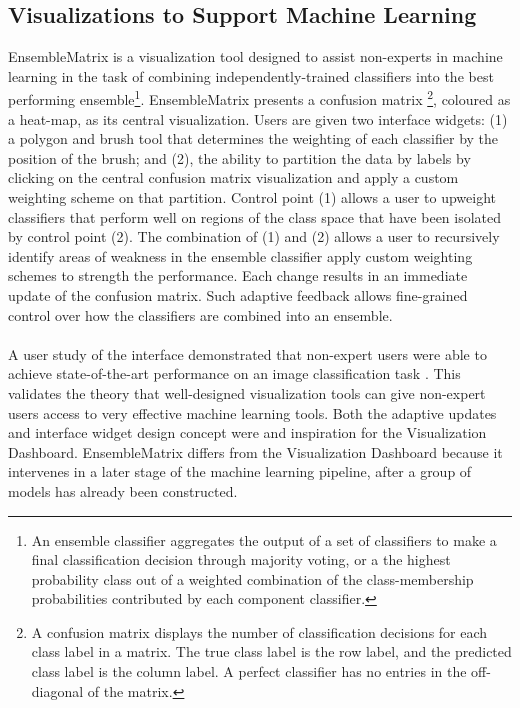 \documentclass{sigchi}
\begin{document}
\subsection{Visualizations to Support Machine Learning}
%
EnsembleMatrix \cite{talbot2009ensemblematrix} is a visualization tool designed to assist non-experts in machine learning in the task of combining independently-trained classifiers into the best performing ensemble\footnote{An ensemble classifier aggregates the output of a set of classifiers to make a final classification decision through majority voting, or a the highest probability class out of a weighted combination of the class-membership probabilities contributed by each component classifier.}. %
%
EnsembleMatrix presents a confusion matrix \footnote{A confusion matrix displays the number of classification decisions for each class label in a matrix. The true class label is the row label, and the predicted class label is the column label. A perfect classifier has no entries in the off-diagonal of the matrix.}, coloured as a heat-map, as its central visualization. %
%
Users are given two interface widgets: (1) a polygon and brush tool that determines the weighting of each classifier by the position of the brush; and (2), the ability to partition the data by labels by clicking on the central confusion matrix visualization and apply a custom weighting scheme on that partition. %
%
Control point (1) allows a user to upweight classifiers that perform well on regions of the class space that have been isolated by control point (2). %
%
The combination of (1) and (2) allows a user to recursively identify areas of weakness in the ensemble classifier apply custom weighting schemes to strength the performance. %
%
Each change results in an immediate update of the confusion matrix. %
%
Such adaptive feedback allows fine-grained control over how the classifiers are combined into an ensemble. %
\\\\
A user study of the interface demonstrated that non-expert users were able to achieve state-of-the-art performance on an image classification task \cite{talbot2009ensemblematrix}. %
%
This validates the theory that well-designed visualization tools can give non-expert users access to very effective machine learning tools. %
Both the adaptive updates and interface widget design concept were and inspiration for the Visualization Dashboard. %
%
EnsembleMatrix differs from the Visualization Dashboard because it intervenes in a later stage of the machine learning pipeline, after a group of models has already been constructed. %
\end{document}
